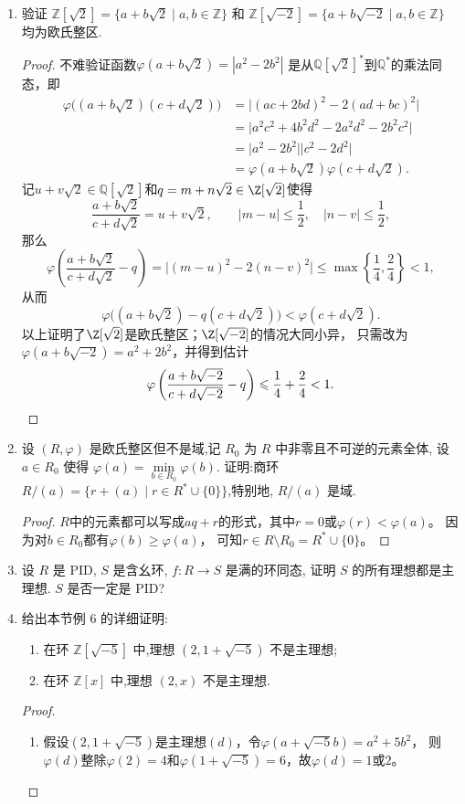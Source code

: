 \begin{enumerate}
\item 验证 $ \mathbb{Z}[\sqrt{2}] = \{ a + b\sqrt{2} \mid a, b \in \mathbb{Z} \} $ 和 $ \mathbb{Z}[\sqrt{-2}] = \{ a + b\sqrt{-2} \mid a, b \in \mathbb{Z} \} $ 均为欧氏整区.
\begin{proof}
    不难验证函数$\varphi(a+b\sqrt{2})=|a^2-2b^2|$
    是从$\mathbb{Q}[\sqrt{2}]^*$到$\mathbb{Q}^*$的乘法同态，即
    \begin{align*}
        \varphi\big((a+b\sqrt{2})(c+d\sqrt{2})\big)
        &=\big|(ac+2bd)^2-2(ad+bc)^2\big|\\
        &=\big|a^2c^2+4b^2d^2-2a^2d^2-2b^2c^2\big|\\
        &=\big|a^2-2b^2\big|\big|c^2-2d^2\big|\\
        &=\varphi(a+b\sqrt{2})\varphi(c+d\sqrt{2}).
    \end{align*}
    记$u+v\sqrt{2}\in\mathbb{Q}[\sqrt{2}]$和$q=m+n\sqrt{2}\in\Z[\sqrt{2}]$使得
    \[\frac{a+b\sqrt{2}}{c+d\sqrt{2}}=u+v\sqrt{2},\qquad
    |m-u|\leqslant\frac{1}{2},\quad|n-v|\leqslant\frac{1}{2},\]
    那么
    \[\varphi\left(\frac{a+b\sqrt{2}}{c+d\sqrt{2}}-q\right)
    =\big|(m-u)^2-2(n-v)^2\big|
    \leqslant\max\left\{\frac{1}{4},\frac{2}{4}\right\}<1,\]
    从而
    \[\varphi\big((a+b\sqrt{2})-q(c+d\sqrt{2})\big)<\varphi(c+d\sqrt{2}).\]
    以上证明了$\Z[\sqrt{2}]$是欧氏整区；$\Z[\sqrt{-2}]$的情况大同小异，
    只需改为$\varphi(a+b\sqrt{-2})=a^2+2b^2$，并得到估计
    \[\varphi\left(\frac{a+b\sqrt{-2}}{c+d\sqrt{-2}}-q\right)
    \leqslant\frac{1}{4}+\frac{2}{4}<1.\qedhere\]
\end{proof}

\item 设 $ (R, \varphi) $ 是欧氏整区但不是域,记 $ R_0 $ 为 $ R $ 中非零且不可逆的元素全体,
设 $ a \in R_0 $ 使得 $ \varphi(a) = \min\limits_{b \in R_0} \varphi(b) $.
证明:商环 $ R/(a) = \{ r + (a) \mid r \in R^* \cup \{0\} \} $,特别地, $ R/(a) $ 是域.
\begin{proof}
    $R$中的元素都可以写成$aq+r$的形式，其中$r=0$或$\varphi(r)<\varphi(a)$。
    因为对$b \in R_0$都有$\varphi(b)\geqslant\varphi(a)$，
    可知$r \in R\setminus R_0=R^*\cup\{0\}$。
\end{proof}

\item 设 $ R $ 是 PID, $ S $ 是含幺环, $ f : R \rightarrow S $ 是满的环同态,
证明 $ S $ 的所有理想都是主理想. $ S $ 是否一定是 PID?

\item 给出本节例 6 的详细证明:
\begin{enumerate}[label=(\arabic*)]
    \item 在环 $ \mathbb{Z}[\sqrt{-5}] $ 中,理想 $ (2, 1 + \sqrt{-5}) $ 不是主理想;
    \item 在环 $ \mathbb{Z}[x] $ 中,理想 $ (2, x) $ 不是主理想.
\end{enumerate}
\begin{proof}
    \begin{enumerate}[label=(\arabic*)]
    \item 假设$(2,1+\sqrt{-5})$是主理想$(d)$，令$\varphi(a+\sqrt{-5}b)=a^2+5b^2$，
    则$\varphi(d)$整除$\varphi(2)=4$和$\varphi(1+\sqrt{-5})=6$，故$\varphi(d)=1$或$2$。


\end{enumerate}
\end{proof}
\end{enumerate}
